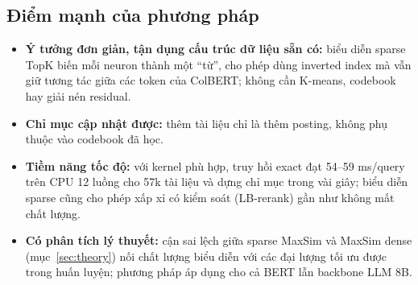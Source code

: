\documentclass[a4paper,13pt]{extreport}
\theoremstyle{plain}
\begin{document}
\subsection{Điểm mạnh của phương pháp}
\begin{itemize}[leftmargin=1.5cm]
  \item \textbf{Ý tưởng đơn giản, tận dụng cấu trúc dữ liệu sẵn có:} biểu diễn sparse TopK biến mỗi neuron thành một ``từ'', cho phép dùng inverted index mà vẫn giữ tương tác giữa các token của ColBERT; không cần K-means, codebook hay giải nén residual.
  \item \textbf{Chỉ mục cập nhật được:} thêm tài liệu chỉ là thêm posting, không phụ thuộc vào codebook đã học.
  \item \textbf{Tiềm năng tốc độ:} với kernel phù hợp, truy hồi exact đạt 54--59 ms/query trên CPU 12 luồng cho 57k tài liệu và dựng chỉ mục trong vài giây; biểu diễn sparse cũng cho phép xấp xỉ có kiểm soát (LB-rerank) gần như không mất chất lượng.
  \item \textbf{Có phân tích lý thuyết:} cận sai lệch giữa sparse MaxSim và MaxSim dense (mục~\ref{sec:theory}) nối chất lượng biểu diễn với các đại lượng tối ưu được trong huấn luyện; phương pháp áp dụng cho cả BERT lẫn backbone LLM 8B.
\end{itemize}
\end{document}
